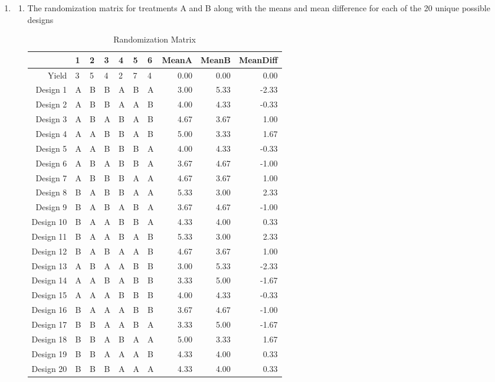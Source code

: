 \documentclass{article}
\begin{document}



\begin{enumerate}
  \item 
    \begin{enumerate}
      \item The randomization matrix for treatments A and B along with the means and mean difference for each of the 20 unique possible designs 
\begin{table}[ht]
\centering
\begin{tabular}{rllllllrrr}
  \hline
 & 1 & 2 & 3 & 4 & 5 & 6 & MeanA & MeanB & MeanDiff \\ 
  \hline
Yield & 3 & 5 & 4 & 2 & 7 & 4 & 0.00 & 0.00 & 0.00 \\ 
  Design 1 & A & B & B & A & B & A & 3.00 & 5.33 & -2.33 \\ 
  Design 2 & A & B & B & A & A & B & 4.00 & 4.33 & -0.33 \\ 
  Design 3 & A & B & A & B & A & B & 4.67 & 3.67 & 1.00 \\ 
  Design 4 & A & A & B & B & A & B & 5.00 & 3.33 & 1.67 \\ 
  Design 5 & A & A & B & B & B & A & 4.00 & 4.33 & -0.33 \\ 
  Design 6 & A & B & A & B & B & A & 3.67 & 4.67 & -1.00 \\ 
  Design 7 & A & B & B & B & A & A & 4.67 & 3.67 & 1.00 \\ 
  Design 8 & B & A & B & B & A & A & 5.33 & 3.00 & 2.33 \\ 
  Design 9 & B & A & B & A & B & A & 3.67 & 4.67 & -1.00 \\ 
  Design 10 & B & A & A & B & B & A & 4.33 & 4.00 & 0.33 \\ 
  Design 11 & B & A & A & B & A & B & 5.33 & 3.00 & 2.33 \\ 
  Design 12 & B & A & B & A & A & B & 4.67 & 3.67 & 1.00 \\ 
  Design 13 & A & B & A & A & B & B & 3.00 & 5.33 & -2.33 \\ 
  Design 14 & A & A & B & A & B & B & 3.33 & 5.00 & -1.67 \\ 
  Design 15 & A & A & A & B & B & B & 4.00 & 4.33 & -0.33 \\ 
  Design 16 & B & A & A & A & B & B & 3.67 & 4.67 & -1.00 \\ 
  Design 17 & B & B & A & A & B & A & 3.33 & 5.00 & -1.67 \\ 
  Design 18 & B & B & A & B & A & A & 5.00 & 3.33 & 1.67 \\ 
  Design 19 & B & B & A & A & A & B & 4.33 & 4.00 & 0.33 \\ 
  Design 20 & B & B & B & A & A & A & 4.33 & 4.00 & 0.33 \\ 
   \hline
\end{tabular}
\caption{Randomization Matrix}
\end{table}    \end{enumerate}
\end{enumerate}
\end{document}
